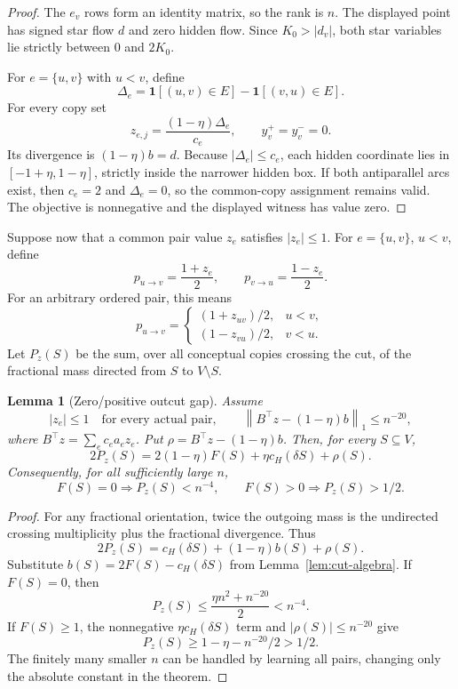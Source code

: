 \documentclass[11pt]{article}
\newtheorem{lemma}[theorem]{Lemma}
\theoremstyle{definition}
\newcommand{\id}{\mathbf{1}}
\newcommand{\cH}{c_H}
\newcommand{\norm}[1]{\left\lVert #1\right\rVert}
\begin{document}
\begin{proof}
The $e_v$ rows form an identity matrix, so the rank is $n$.  The displayed
point has signed star flow $d$ and zero hidden flow.  Since $K_0>|d_v|$, both
star variables lie strictly between $0$ and $2K_0$.

For $e=\{u,v\}$ with $u<v$, define
\[
 \Delta_e=\id[(u,v)\in E]-\id[(v,u)\in E].
\]
For every copy set
\[
        z_{e,j}=\frac{(1-\eta)\Delta_e}{c_e},
        \qquad y_v^+=y_v^-=0.
\]
Its divergence is $(1-\eta)b=d$.  Because $|\Delta_e|\le c_e$, each hidden
coordinate lies in $[-1+\eta,1-\eta]$, strictly inside the narrower hidden
box.  If both antiparallel arcs exist, then $c_e=2$ and $\Delta_e=0$, so the
common-copy assignment remains valid.  The objective is nonnegative and the
displayed witness has value zero.
\end{proof}

Suppose now that a common pair value $z_e$ satisfies $|z_e|\le1$.  For
$e=\{u,v\}$, $u<v$, define
\begin{equation}\label{eq:fractional-orientation}
 p_{u\to v}=\frac{1+z_e}{2},
 \qquad
 p_{v\to u}=\frac{1-z_e}{2}.
\end{equation}
For an arbitrary ordered pair, this means
\[
 p_{u\to v}=\begin{cases}
 (1+z_{uv})/2,&u<v,\\
 (1-z_{vu})/2,&v<u.
 \end{cases}
\]
Let $P_z(S)$ be the sum, over all conceptual copies crossing the cut, of the
fractional mass directed from $S$ to $V\setminus S$.

\begin{lemma}[Zero/positive outcut gap]\label{lem:gap}
Assume
\begin{equation}\label{eq:certificate}
 |z_e|\le1\quad\text{for every actual pair},
 \qquad
 \norm{B^\top z-(1-\eta)b}_1\le n^{-20},
\end{equation}
where $B^\top z=\sum_e c_ea_ez_e$.  Put
$\rho=B^\top z-(1-\eta)b$.  Then, for every $S\subseteq V$,
\begin{equation}\label{eq:fractional-cut}
 2P_z(S)=2(1-\eta)F(S)+\eta\cH(\delta S)+\rho(S).
\end{equation}
Consequently, for all sufficiently large $n$,
\[
 F(S)=0 \Longrightarrow P_z(S)<n^{-4},
 \qquad
 F(S)>0 \Longrightarrow P_z(S)>1/2.
\]
\end{lemma}

\begin{proof}
For any fractional orientation, twice the outgoing mass is the undirected
crossing multiplicity plus the fractional divergence.  Thus
\[
 2P_z(S)=\cH(\delta S)+(1-\eta)b(S)+\rho(S).
\]
Substitute $b(S)=2F(S)-\cH(\delta S)$ from
Lemma~\ref{lem:cut-algebra}.  If $F(S)=0$, then
\[
 P_z(S)\le \frac{\eta n^2+n^{-20}}2<n^{-4}.
\]
If $F(S)\ge1$, the nonnegative $\eta\cH(\delta S)$ term and
$|\rho(S)|\le n^{-20}$ give
\[
 P_z(S)\ge1-\eta-n^{-20}/2>1/2.
\]
The finitely many smaller $n$ can be handled by learning all pairs, changing
only the absolute constant in the theorem.
\end{proof}
\end{document}
